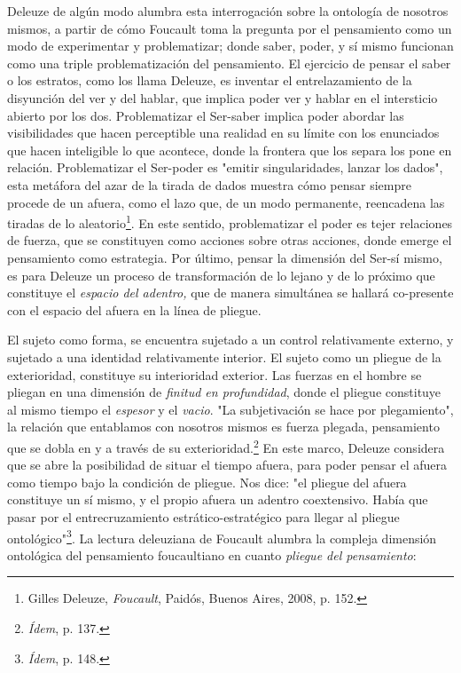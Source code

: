 Deleuze de algún modo alumbra esta interrogación sobre la ontología de
nosotros mismos, a partir de cómo Foucault toma la pregunta por el
pensamiento como un modo de experimentar y problematizar; donde saber,
poder, y sí mismo funcionan como una triple problematización del
pensamiento. El ejercicio de pensar el saber o los estratos, como los
llama Deleuze, es inventar el entrelazamiento de la disyunción del ver y
del hablar, que implica poder ver y hablar en el intersticio abierto por
los dos. Problematizar el Ser-saber implica poder abordar las
visibilidades que hacen perceptible una realidad en su límite con los
enunciados que hacen inteligible lo que acontece, donde la frontera que
los separa los pone en relación. Problematizar el Ser-poder es "emitir
singularidades, lanzar los dados", esta metáfora del azar de la tirada
de dados muestra cómo pensar siempre procede de un afuera, como el lazo
que, de un modo permanente, reencadena las tiradas de lo
aleatorio\footnote{Gilles Deleuze, \emph{Foucault}, Paidós, Buenos
  Aires, 2008, p. 152.}. En este sentido, problematizar el poder es
tejer relaciones de fuerza, que se constituyen como acciones sobre otras
acciones, donde emerge el pensamiento como estrategia. Por último,
pensar la dimensión del Ser-sí mismo, es para Deleuze un proceso de
transformación de lo lejano y de lo próximo que constituye el
\emph{espacio del adentro,} que de manera simultánea se hallará
co-presente con el espacio del afuera en la línea de pliegue.

El sujeto como forma, se encuentra sujetado a un control relativamente
externo, y sujetado a una identidad relativamente interior. El sujeto
como un pliegue de la exterioridad, constituye su interioridad exterior.
Las fuerzas en el hombre se pliegan en una dimensión de \emph{finitud en
profundidad}, donde el pliegue constituye al mismo tiempo el
\emph{espesor} y el \emph{vacio}. "La subjetivación se hace por
plegamiento", la relación que entablamos con nosotros mismos es fuerza
plegada, pensamiento que se dobla en y a través de su
exterioridad.\footnote{\emph{Ídem}, p. 137.} En este marco, Deleuze
considera que se abre la posibilidad de situar el tiempo afuera, para
poder pensar el afuera como tiempo bajo la condición de pliegue. Nos
dice: "el pliegue del afuera constituye un sí mismo, y el propio afuera
un adentro coextensivo. Había que pasar por el entrecruzamiento
estrático-estratégico para llegar al pliegue ontológico"\footnote{\emph{Ídem},
  p. 148.}. La lectura deleuziana de Foucault alumbra la compleja
dimensión ontológica del pensamiento foucaultiano en cuanto
\emph{pliegue del pensamiento}:

